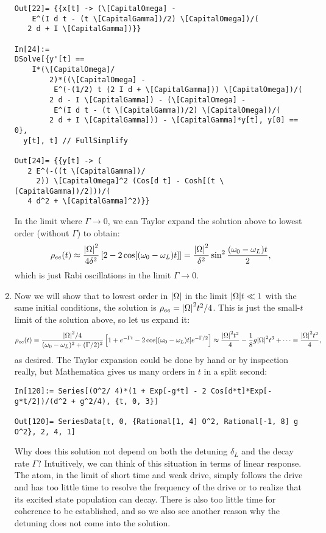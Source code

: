 \documentclass{article}
\theoremstyle{definition}
\newcommand{\f}[2]{\frac{#1}{#2}}
\newcommand{\lb}{\left[}
\newcommand{\rb}{\right]}
\begin{document}
\begin{enumerate}[label=(\alph*)]
\begin{lstlisting}
Out[22]= {{x[t] -> (\[CapitalOmega] - 
    E^(I d t - (t \[CapitalGamma])/2) \[CapitalOmega])/(
   2 d + I \[CapitalGamma])}}

In[24]:= 
DSolve[{y'[t] == 
    I*(\[CapitalOmega]/
        2)*((\[CapitalOmega] - 
         E^(-(1/2) t (2 I d + \[CapitalGamma])) \[CapitalOmega])/(
        2 d - I \[CapitalGamma]) - (\[CapitalOmega] - 
         E^(I d t - (t \[CapitalGamma])/2) \[CapitalOmega])/(
        2 d + I \[CapitalGamma])) - \[CapitalGamma]*y[t], y[0] == 0}, 
  y[t], t] // FullSimplify

Out[24]= {{y[t] -> (
   2 E^(-((t \[CapitalGamma])/
     2)) \[CapitalOmega]^2 (Cos[d t] - Cosh[(t \[CapitalGamma])/2]))/(
   4 d^2 + \[CapitalGamma]^2)}}
\end{lstlisting}

In the limit where $\Gamma \to 0$, we can Taylor expand the solution above to lowest order (without $\Gamma$) to obtain:
\begin{align*}
\rho_{ee}(t) \approx \f{\abs{\Omega}^2}{4 \delta^2} \lb 2 - 2\cos [(\omega_0 - \omega_L)t] \rb = \f{\abs{\Omega}^2}{\delta^2} \sin^2 \f{(\omega_0 - \omega_L)t}{2},
\end{align*}
which is just Rabi oscillations in the limit $\Gamma \to 0$. 



\item Now we will show that to lowest order in $\abs{\Omega}$ in the limit $\abs{\Omega} t \ll 1$ with the same initial conditions, the solution is $\rho_{ee} = \abs{\Omega}^2 t^2 /4$.  This is just the small-$t$ limit of the solution above, so let us expand it:
\begin{align*}
\rho_{ee}(t) = \f{\abs{\Omega}^2/4}{(\omega_0 - \omega_L)^2 + (\Gamma/2)^2} \lb 1 + e^{-\Gamma t} -2 \cos [(\omega_0 - \omega_L)t] e^{-\Gamma/2} \rb 
\approx \f{\abs{\Omega}^2 t^2}{4} - \f{1}{8} g \abs{\Omega}^2 t^3 + \dots  = \f{\abs{\Omega}^2 t^2}{4}, 
\end{align*}
as desired. The Taylor expansion could be done by hand or by inspection really, but Mathematica gives us many orders in $t$ in a split second:
\begin{lstlisting}
In[120]:= Series[(O^2/ 4)*(1 + Exp[-g*t] - 2 Cos[d*t]*Exp[-g*t/2])/(d^2 + g^2/4), {t, 0, 3}]

Out[120]= SeriesData[t, 0, {Rational[1, 4] O^2, Rational[-1, 8] g O^2}, 2, 4, 1]
\end{lstlisting}

Why does this solution not depend on both the detuning $\delta_L$ and the decay rate $\Gamma$? Intuitively, we can think of this situation in terms of linear response. The atom, in the limit of short time and weak drive, simply follows the drive and has too little time to resolve the frequency of the drive or to realize that its excited state population can decay. There is also too little time for coherence to be established, and so we also see another reason why the detuning does not come into the solution.




\end{enumerate}
\end{document}

